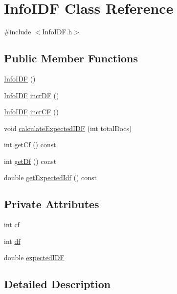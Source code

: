 \hypertarget{classInfoIDF}{\section{\-Info\-I\-D\-F \-Class \-Reference}
\label{classInfoIDF}
}


{\ttfamily \#include $<$\-Info\-I\-D\-F.\-h$>$}

\subsection*{\-Public \-Member \-Functions}
\begin{DoxyCompactItemize}
\item 
\hyperlink{classInfoIDF_a30af5f2242c80104a7e1c1256b885b63}{\-Info\-I\-D\-F} ()
\item 
\hyperlink{classInfoIDF}{\-Info\-I\-D\-F} \hyperlink{classInfoIDF_a199f501db7a955add27cd829fb497ae9}{incr\-D\-F} ()
\item 
\hyperlink{classInfoIDF}{\-Info\-I\-D\-F} \hyperlink{classInfoIDF_ad5e50d4e6b79a4d0f4fb3ecfb1d6e5cb}{incr\-C\-F} ()
\item 
void \hyperlink{classInfoIDF_a079b208b94e48ea1c7fd6c6c108654fa}{calculate\-Expected\-I\-D\-F} (int total\-Docs)
\item 
int \hyperlink{classInfoIDF_a74f5057f7e24af5115f27467a44e0cd0}{get\-Cf} () const 
\item 
int \hyperlink{classInfoIDF_a5cceafbda3b8ff43cb8ed31bf2a8b190}{get\-Df} () const 
\item 
double \hyperlink{classInfoIDF_a1069a5221aa5028627cb3f9d21a4b228}{get\-Expected\-Idf} () const 
\end{DoxyCompactItemize}
\subsection*{\-Private \-Attributes}
\begin{DoxyCompactItemize}
\item 
int \hyperlink{classInfoIDF_a73b64360314c93df2622667f71a1b9f3}{cf}
\item 
int \hyperlink{classInfoIDF_aa3e5edea9863b659979314128757dfbb}{df}
\item 
double \hyperlink{classInfoIDF_a46e58e37974cf8598229a7e5bdc63e50}{expected\-I\-D\-F}
\end{DoxyCompactItemize}


\subsection{\-Detailed \-Description}


